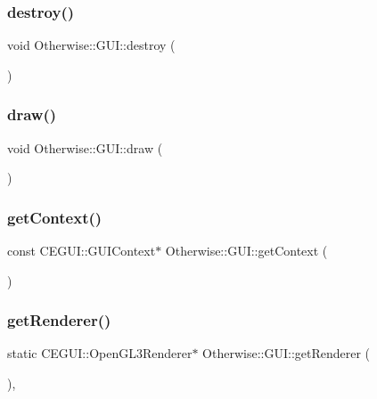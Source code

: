\subsubsection{\texorpdfstring{destroy()}{destroy()}}
{\footnotesize\ttfamily void Otherwise\+::\+G\+U\+I\+::destroy (\begin{DoxyParamCaption}{ }\end{DoxyParamCaption})}

\mbox{\label{class_otherwise_1_1_g_u_i_a44cfa8af4d72df100699e099ebc696ad}} 
\subsubsection{\texorpdfstring{draw()}{draw()}}
{\footnotesize\ttfamily void Otherwise\+::\+G\+U\+I\+::draw (\begin{DoxyParamCaption}{ }\end{DoxyParamCaption})}

\mbox{\label{class_otherwise_1_1_g_u_i_ac0499b56edd2d8b73381e90670b21e8d}} 
\subsubsection{\texorpdfstring{get\+Context()}{getContext()}}
{\footnotesize\ttfamily const C\+E\+G\+U\+I\+::\+G\+U\+I\+Context$\ast$ Otherwise\+::\+G\+U\+I\+::get\+Context (\begin{DoxyParamCaption}{ }\end{DoxyParamCaption})\hspace{0.3cm}{\ttfamily [inline]}}

\mbox{\label{class_otherwise_1_1_g_u_i_a0f7980dfb3eb65fe8be201bee814aa19}} 
\subsubsection{\texorpdfstring{get\+Renderer()}{getRenderer()}}
{\footnotesize\ttfamily static C\+E\+G\+U\+I\+::\+Open\+G\+L3\+Renderer$\ast$ Otherwise\+::\+G\+U\+I\+::get\+Renderer (\begin{DoxyParamCaption}{ }\end{DoxyParamCaption})\hspace{0.3cm}{\ttfamily [inline]}, {\ttfamily [static]}}

